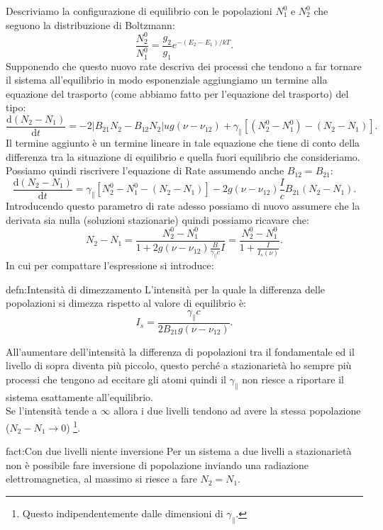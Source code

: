 Descriviamo la configurazione di equilibrio con le popolazioni $N_1^0$ e $N_2^0$ che seguono la distribuzione di Boltzmann:
\[
    \frac{N_2^0}{N_1^0} = \frac{g_2}{g_1}e^{-\left(E_2-E_1\right) /kT}
.\] 
Supponendo che questo nuovo rate descriva dei processi che tendono a far tornare il sistema all'equilibrio in modo esponenziale aggiungiamo un termine alla equazione del trasporto (come abbiamo fatto per l'equazione del trasporto) del tipo:
\[
    \frac{\text{d} \left(N_2-N_1\right)}{\text{d} t} =
    -2\left|B_{21}N_2-B_{12}N_2\right|u g(\nu-\nu_{12}) 
    +\gamma_{\parallel}\left[\left(N_2^0-N_1^0\right)-
    \left(N_2-N_1\right)\right]
.\] 
Il termine aggiunto è un termine lineare in tale equazione che tiene di conto della differenza tra la situazione di equilibrio e quella fuori equilibrio che consideriamo.\\
Possiamo quindi riscrivere l'equazione di Rate assumendo anche $B_{12}=B_{21}$:
\[
    \frac{\text{d} \left(N_2-N_1\right)}{\text{d} t} =
    \gamma_{\parallel}\left[N_2^0-N_1^0 - \left(N_2-N_1\right)\right]
    -2g(\nu-\nu_{12}) \frac{I}{c}B_{21}\left(N_2-N_1\right)
.\] 
Introducendo questo parametro di rate adesso possiamo di nuovo assumere che la derivata sia nulla (soluzioni stazionarie) quindi possiamo ricavare che:
\[
    N_2-N_1 = \frac{N_2^0-N_1^0}{1+2g(\nu-\nu_{12})
    \frac{B}{\gamma_{\parallel}c}I}=
    \frac{N_2^0-N_1^0}{1+\frac{I}{I_s(\nu)}}
.\] 
In cui per compattare l'espressione si introduce:
\begin{defn}{defn:Intensità di dimezzamento}
L'intensità per la quale la differenza delle popolazioni si dimezza rispetto al valore di equilibrio è:
\[
    I_s = \frac{\gamma_\parallel c}{2B_{21}g(\nu-\nu_{12})}
.\] 
\end{defn}
All'aumentare dell'intensità la differenza di popolazioni tra il fondamentale ed il livello di sopra diventa più piccolo, questo perché a stazionarietà ho sempre più processi che tengono ad eccitare gli atomi quindi il $\gamma_\parallel$  non riesce a riportare il sistema esattamente all'equilibrio. \\
Se l'intensità tende a $\infty$ allora i due livelli tendono ad avere la stessa popolazione ($N_2-N_1\to 0$)
\footnote{Questo indipendentemente dalle dimensioni di $\gamma_\parallel$.}.
\begin{fact}{fact:Con due livelli niente inversione}
Per un sistema a due livelli a stazionarietà non è possibile fare inversione di popolazione inviando una radiazione elettromagnetica, al massimo si riesce a fare $N_2=N_1$.
\end{fact}

